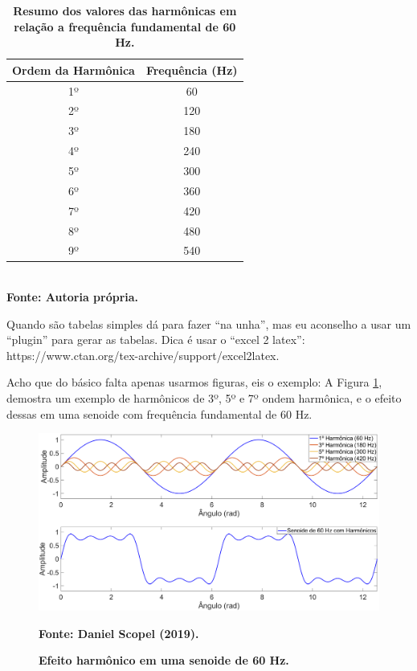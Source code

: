 \documentclass[
	12pt,				%
	openright,			%
	oneside,			%
	a4paper,			%
	chapter=TITLE,		%
	section=TITLE,		%
	subsection=TITLE,	%
	subsubsection=TITLE,%
    subsubsubsection=TITLE,%
	english,			%
    french,
    spanish,
	brazil				%
	]{utfprtex2}
\begin{document}
\begin{table}[H]
\centering
\caption {\textbf{Resumo dos valores das harmônicas em relação a frequência fundamental de 60 Hz.}}
\label{tab:harmonicas}
\begin{tabular}{cc}
\hline
\textbf{Ordem da Harmônica} & \textbf{Frequência (Hz)} \\ \hline
1º                          &           60              \\ \hline
2º                          &           120             \\ \hline
3º                          &           180             \\ \hline
4º                          &           240             \\ \hline
5º                          &           300             \\ \hline
6º                          &           360             \\ \hline
7º                          &           420             \\ \hline
8º                          &           480             \\ \hline
9º                          &           540             \\ \hline
\end{tabular}
\\

\textbf{Fonte: Autoria própria.}
\end{table}


Quando são tabelas simples dá para fazer ``na unha'', mas eu aconselho a usar um ``plugin'' para gerar as tabelas. Dica é usar o ``excel 2 latex'': https://www.ctan.org/tex-archive/support/excel2latex.




Acho que do básico falta apenas usarmos figuras, eis o exemplo:
A Figura \ref{fig:Harmonicos}, demostra um exemplo de harmônicos de 3º, 5º e 7º ondem harmônica, e o efeito dessas em uma senoide com frequência fundamental de 60 Hz. 

\begin{figure}[H]
\centering
\includegraphics[scale=0.3]{img/harmonicos1.png}
\caption{\textbf{Efeito harmônico em uma senoide de 60 Hz.}}
\textbf{Fonte: Daniel Scopel (2019).}
\label{fig:Harmonicos}
\end{figure}
\end{document}

